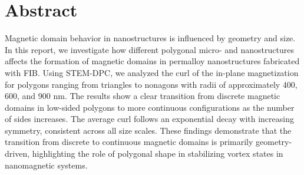 \section*{Abstract}


Magnetic domain behavior in nanostructures is influenced by geometry and size. In this report, we investigate how different polygonal micro- and nanostructures affects the formation of magnetic domains in permalloy nanostructures fabricated with FIB. Using STEM-DPC, we analyzed the curl of the in-plane magnetization for polygons ranging from triangles to nonagons with radii of approximately 400, 600, and 900 nm. The results show a clear transition from discrete magnetic domains in low-sided polygons to more continuous configurations as the number of sides increases. The average curl follows an exponential decay with increasing symmetry, consistent across all size scales. These findings demonstrate that the transition from discrete to continuous magnetic domains is primarily geometry-driven, highlighting the role of polygonal shape in stabilizing vortex states in nanomagnetic systems.
